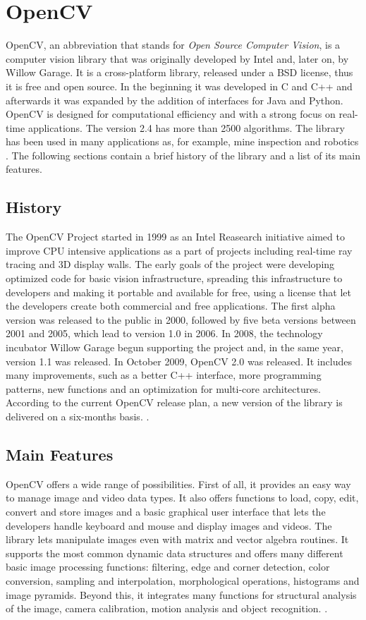 	
  \section{OpenCV}
	\mbox{OpenCV}, an abbreviation that stands for \emph{Open Source Computer Vision}, is a computer vision library that was originally developed by Intel and, later on, by Willow Garage.
	It is a cross-platform library, released under a BSD license, thus it is free and open source. In the beginning it was developed in C and C++ and afterwards it was expanded by the addition of interfaces for Java and Python. \mbox{OpenCV} is designed for computational efficiency and with a strong focus on real-time applications. The version 2.4 has more than 2500 algorithms. The library has been used in many applications as, for example, mine inspection and robotics \cite{OpenCV:MainWebPage}. The following sections contain a brief history of the library and a list of its main features.
		
	\subsection*{History}
	The \mbox{OpenCV} Project started in 1999 as an Intel Reasearch initiative aimed to improve CPU intensive applications as a part of projects including real-time ray tracing and 3D display walls. The early goals of the project were developing optimized code for basic vision infrastructure, spreading this infrastructure to developers and making it portable and available for free, using a license that let the developers create both commercial and free applications.\newline
	The first alpha version was released to the public in 2000, followed by five beta versions between 2001 and 2005, which lead to version 1.0 in 2006. In 2008, the technology incubator Willow Garage begun supporting the project and, in the same year, version 1.1  was released.
	In October 2009, \mbox{OpenCV} 2.0 was released. It includes many improvements, such as a better C++ interface, more programming patterns, new functions and an optimization for multi-core architectures. According to the current \mbox{OpenCV} release plan, a new version of the library is delivered on a six-months basis. \cite{OpenCV:ChangeLogs}.
	
	\subsection*{Main Features}
	\mbox{OpenCV} offers a wide range of possibilities. First of all, it provides an easy way to manage image and video data types. It also offers functions to load, copy, edit, convert and store images and a basic graphical user interface that lets the developers handle keyboard and mouse and display images and videos. The library lets manipulate images even with matrix and vector algebra routines. It supports the most common dynamic data structures and offers many different basic image processing functions: filtering, edge and corner detection, color conversion, sampling and interpolation, morphological operations, histograms and image pyramids. Beyond this, it integrates many functions for structural analysis of the image, camera calibration, motion analysis and object recognition. \cite{Agam2006}.
